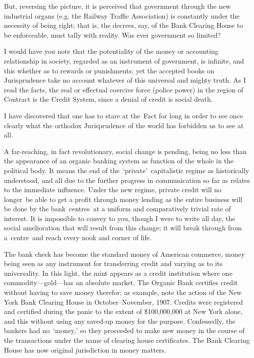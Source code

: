 \documentclass[openany,nobib]{tufte-book}
\begin{document}
\newpage But, reversing the picture, it is perceived that government through the
new industrial organs (e.g. the Railway Traffic Association) is
constantly under the necessity of being right; that is, the decrees,
say, of the Bank Clearing House to be enforceable, must tally with
reality. Was ever government so limited?~

I would have you note that the potentiality of the money or accounting
relationship in society, regarded as an instrument of government, is
infinite, and this whether as to rewards or punishments; yet the
accepted books on Jurisprudence take no account whatever of this
universal and mighty truth. As I read the facts, the real or effectual
coercive force (police power) in the region of Contract is the Credit
System, since a denial of credit is social death.~

I have discovered that one has to stare at the~Fact for long in order to
see once clearly what the orthodox Jurisprudence of the world has
forbidden us to see at all.~

A far-reaching, in fact revolutionary, social change is pending, being
no less than the appearance of an organic banking system as function of
the whole in the political body. It means the end of
the~`private'~capitalistic regime as historically understood, and all
due to the further progress in communication so far as relates to the
immediate influence. Under the new regime, private credit will no
longer~be able to get a profit through \textquotesingle money
lending\textquotesingle{} as the entire business will be done by the
bank~centres~at a uniform and comparatively trivial rate of interest. It
is impossible to convey to you, though I were to write all day, the
social amelioration that will result from this change; it will break
through from a~centre~and reach every nook and corner of life.~

The bank check has become the standard money of American commerce, money
being seen as any instrument for transferring credit and varying as to
its universality. In this light, the mint appears as a credit
institution where one commodity---gold---has an absolute market. The
Organic Bank certifies credit without having to save
\textquotesingle money\textquotesingle{} therefor; as example, note the
action of the New York Bank Clearing House in October--November, 1907.
Credits were registered and certified during the panic to the extent of
\$100,000,000 at New York alone, and this without using any saved-up
money for the purpose. Confessedly, the bankers had no~`money,' so they
proceeded to make new money in the course of the transactions under the
name of clearing house certificates. The Bank Clearing House has now
original jurisdiction in money matters.~
\end{document}
